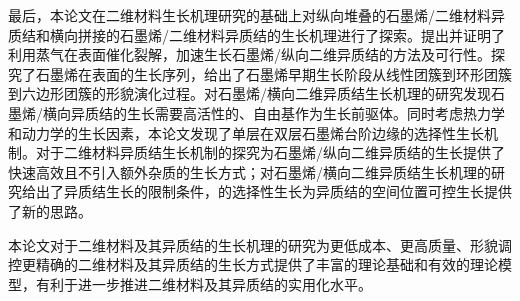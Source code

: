 \begin{chineseabstract}
    最后，本论文在二维材料生长机理研究的基础上对纵向堆叠的石墨烯/二维材料异质结和横向拼接的石墨烯/二维材料异质结的生长机理进行了探索。提出并证明了利用蒸气在表面催化裂解，加速生长石墨烯/纵向二维异质结的方法及可行性。探究了石墨烯在表面的生长序列，给出了石墨烯早期生长阶段从线性团簇到环形团簇到六边形团簇的形貌演化过程。对石墨烯/横向二维异质结生长机理的研究发现石墨烯/横向异质结的生长需要高活性的、自由基作为生长前驱体。同时考虑热力学和动力学的生长因素，本论文发现了单层在双层石墨烯台阶边缘的选择性生长机制。对于二维材料异质结生长机制的探究为石墨烯/纵向二维异质结的生长提供了快速高效且不引入额外杂质的生长方式；对石墨烯/横向二维异质结生长机理的研究给出了异质结生长的限制条件，的选择性生长为异质结的空间位置可控生长提供了新的思路。

    本论文对于二维材料及其异质结的生长机理的研究为更低成本、更高质量、形貌调控更精确的二维材料及其异质结的生长方式提供了丰富的理论基础和有效的理论模型，有利于进一步推进二维材料及其异质结的实用化水平。

\end{chineseabstract}